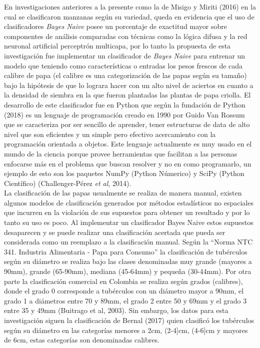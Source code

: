 En investigaciones anteriores a la presente como la de Misigo y Miriti (2016) en la cual se clasificaron
manzanas según su variedad, queda en evidencia que el uso de clasificadores
\textit{Bayes Naive} posee un porcentaje de exactitud mayor sobre componentes de análisis
comparadas con técnicas como la lógica difusa y la red neuronal artificial perceptrón
multicapa, por lo tanto la propuesta de esta investigación fue implementar un clasificador
de \textit{Bayes Naive} para entrenar un modelo que teniendo como características o
entradas los pesos frescos de cada calibre de papa (el calibre es una categorización
de las papas según su tamaño) bajo la hipótesis de que lo lograra hacer con un alto nivel
de aciertos en cuanto a la densidad de siembra en la que fueron plantadas las plantas
de papa criolla. El desarrollo de este clasificador fue en Python que según la fundación
de Python (2018) es un lenguaje de programación creado en 1990 por Guido Van Rossum que
se caracteriza por ser sencillo de aprender, tener estructuras de data de alto nivel que
son eficientes y un simple pero efectivo acercamiento con la programación orientada a
objetos. Este lenguaje actualmente es muy usado en el mundo de la ciencia porque provee
herramientas que facilitan a las personas enfocarse más en el problema que buscan
resolver y no en como programarlo, un ejemplo de esto son los paquetes NumPy (Python
Númerico) y SciPy (Python Científico) (Challenger-Pérez \textit{et al}, 2014).\\

La clasificación de las papas usualmente se realiza de manera manual, existen algunos
modelos de clasificación generados por métodos estadísticos no espaciales que incurren
en la violación de sus supuestos para obtener un resultado y por lo tanto su uso es poco.
Al implementar un clasificador Bayes Naive estos supuestos desaparecen y se puede
realizar una clasificación acertada que pueda ser considerada como un reemplazo a la
clasificación manual. Según la "`Norma NTC 341. Industria Alimentaria - Papa para
Consumo"' la clasificación de tubérculos según su diámetro se realiza bajo las clases
denominadas muy grande (mayores a 90mm), grande (65-90mm), mediana (45-64mm) y pequeña
(30-44mm). Por otra parte la clasificación comercial en Colombia se realiza según grados
(calibres), donde el grado 0 corresponde a tubérculos con un diámetro mayor a 90mm, el
grado 1 a diámetros entre 70 y 89mm, el grado 2 entre 50 y 69mm y el grado 3 entre 35 y
49mm (Buitrago et al, 2003). Sin embargo, los datos para esta investigación siguen la
clasificación de Bernal (2017) quien clasificó los tubérculos según su diámetro en las
categorías menores a 2cm, (2-4]cm, (4-6]cm y mayores de 6cm, estas categorías son
denominadas calibres.\\

